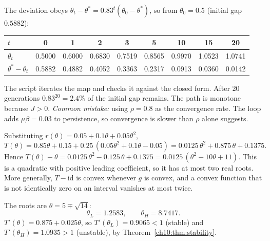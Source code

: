 \documentclass[../solutions_manual.tex]{subfiles}
\begin{document}
 The deviation obeys $\theta_t - \theta^* = 0.83^t(\theta_0 - \theta^*)$, so from $\theta_0 = 0.5$ (initial gap $0.5882$):
\begin{center}
\begin{tabular}{lcccccccc}
\toprule
$t$ & 0 & 1 & 2 & 3 & 5 & 10 & 15 & 20 \\
\midrule
$\theta_t$ & 0.5000 & 0.6000 & 0.6830 & 0.7519 & 0.8565 & 0.9970 & 1.0523 & 1.0741 \\
$\theta^* - \theta_t$ & 0.5882 & 0.4882 & 0.4052 & 0.3363 & 0.2317 & 0.0913 & 0.0360 & 0.0142 \\
\bottomrule
\end{tabular}
\end{center}
The script iterates the map and checks it against the closed form. After 20 generations $0.83^{20} = 2.4\%$ of the initial gap remains. The path is monotone because $J > 0$. \textit{Common mistake:} using $\rho = 0.8$ as the convergence rate. The loop adds $\mu\beta = 0.03$ to persistence, so convergence is slower than $\rho$ alone suggests.

 Substituting $r(\theta) = 0.05 + 0.1\theta + 0.05\theta^2$,
\[
T(\theta) = 0.85\theta + 0.15 + 0.25\,(0.05\theta^2 + 0.1\theta - 0.05) = 0.0125\,\theta^2 + 0.875\,\theta + 0.1375 .
\]
Hence $T(\theta) - \theta = 0.0125\,\theta^2 - 0.125\,\theta + 0.1375 = 0.0125\,(\theta^2 - 10\theta + 11)$. This is a quadratic with positive leading coefficient, so it has at most two real roots. More generally, $T - \mathrm{id}$ is convex whenever $g$ is convex, and a convex function that is not identically zero on an interval vanishes at most twice.

 The roots are $\theta = 5 \mp \sqrt{14}$:
\[
\theta_L = 1.2583, \qquad \theta_H = 8.7417 .
\]
$T'(\theta) = 0.875 + 0.025\theta$, so $T'(\theta_L) = 0.9065 < 1$ (stable) and $T'(\theta_H) = 1.0935 > 1$ (unstable), by Theorem~\ref{ch10:thm:stability}.
\end{document}
